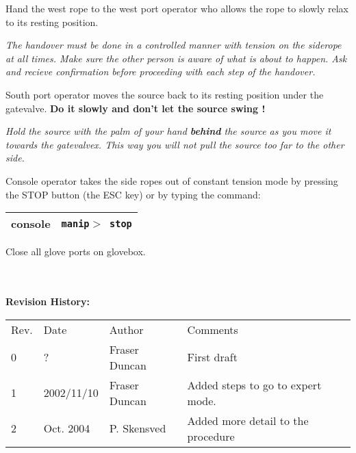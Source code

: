 \begin{enumerate}
\checkitem Hand the west rope  to the
  west port operator who allows the rope to slowly relax to
  its resting position.

\small
{\em The handover must be done in a controlled manner with tension on the siderope at
all times. Make sure the other person
is aware of what is about to happen. Ask and recieve confirmation before proceeding
with each step of the handover. }
\normalsize


  
\checkitem South port operator moves the source back to its resting position
under the gatevalve.
{\bf Do it slowly and don't let the source swing !}

\small
{\em Hold the source with the palm of your hand {\bf behind} the source as you
move it towards the gatevalvex. This way you will not pull the source
too far to the other side.
}
\normalsize


\checkitem  Console operator takes the side ropes out of constant tension
  mode by pressing the STOP button (the ESC key) or by typing the
  command:
  \begin{center}
  \begin{tabular}{|l|l|}
  \hline
  console & {\tt manip$>$ stop} \\
  \hline
  \end{tabular}
  \end{center}

\checkitem Close all glove ports on glovebox.


\end{enumerate}  


{\small
~\\
~\\
\noindent
{\bf Revision History:}\\
\begin{tabular}{llll}
Rev. & Date & Author & Comments\\
0           &  ?  &Fraser Duncan &
\parbox[t]{3.0in}{
  First draft
}\\

1             & 2002/11/10    & Fraser Duncan &
\parbox[t]{3.0in}{
  Added steps to go to expert mode.
}\\

2   & Oct. 2004 & P. Skensved &
\parbox[t]{3.0in}{
 Added more detail to the procedure
}
\end{tabular}
}

 
  



